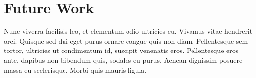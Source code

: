 \section{Future Work}
Nunc viverra facilisis leo, et elementum odio ultricies eu. Vivamus vitae hendrerit orci. Quisque sed dui eget purus ornare congue quis non diam. Pellentesque sem tortor, ultricies ut condimentum id, suscipit venenatis eros. Pellentesque eros ante, dapibus non bibendum quis, sodales eu purus. Aenean dignissim posuere massa eu scelerisque. Morbi quis mauris ligula.